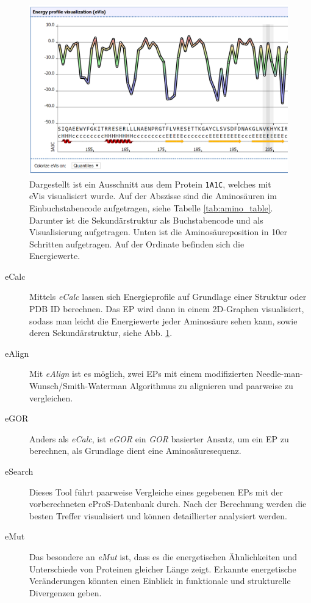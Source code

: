 \begin{figure}
\includegraphics[width=.95\textwidth]{images/ePros.png}
\caption{Dargestellt ist ein Ausschnitt aus dem Protein \texttt{1A1C}, welches mit \ac{eVis} visualisiert wurde. Auf der Abszisse sind die Aminosäuren im Einbuchstabencode aufgetragen, siehe Tabelle \ref{tab:amino_table}. Darunter ist die Sekundärstruktur als Buchstabencode und als Visualisierung aufgetragen. Unten ist die Aminosäureposition in 10er Schritten aufgetragen. Auf der Ordinate befinden sich die Energiewerte.}
\label{fig:epros}
\end{figure}

\begin{description}
\item[eCalc]
Mittels \emph{eCalc} lassen sich Energieprofile auf Grundlage einer Struktur oder \ac{PDB} ID berechnen. Das EP wird dann in einem 2D-Graphen visualisiert, sodass man leicht die Energiewerte jeder Aminosäure sehen kann, sowie deren Sekundärstruktur, siehe Abb. \ref{fig:epros}.
\item[eAlign]
Mit \emph{eAlign} ist es möglich, zwei EPs mit einem modifizierten Needle-man-Wunsch/Smith-Waterman Algorithmus zu alignieren und paarweise zu vergleichen.
\item[eGOR]
Anders als \emph{eCalc}, ist \emph{eGOR} ein \emph{GOR} \cite{Garnier.1996} basierter Ansatz, um ein EP zu berechnen, als Grundlage dient eine Aminosäuresequenz.
\item[eSearch]
Dieses Tool führt paarweise Vergleiche eines gegebenen EPs mit der vorberechneten eProS-Datenbank durch. Nach der Berechnung werden die besten Treffer visualisiert und können detaillierter analysiert werden.
\item[eMut]
Das besondere an \emph{eMut} ist, dass es die energetischen Ähnlichkeiten und Unterschiede von Proteinen gleicher Länge zeigt. Erkannte energetische Veränderungen könnten einen Einblick in funktionale und strukturelle Divergenzen geben.
\end{description}


